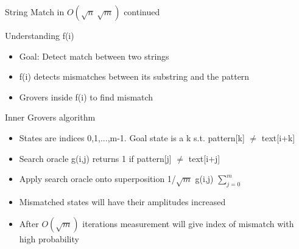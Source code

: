 \documentclass{beamer}
\begin{document}
\begin{frame}{String Match in \(O(\sqrt{n}\ \sqrt{m})\) continued}
  \begin{block}{Understanding f(i)}
    \begin{itemize}
      \item Goal: Detect match between two strings
      \item f(i) detects mismatches between its substring and the pattern
      \item Grovers inside f(i) to find mismatch


    \end{itemize}
  \end{block}
  \begin{block}{Inner Grovers algorithm}
    \begin{itemize}
      \item States are indices 0,1,...,m-1. Goal state is a k s.t. pattern[k] $\neq$ text[i+k]
      \item Search oracle g(i,j) returns 1 if  pattern[j] $\neq$ text[i+j]
      \item Apply search oracle onto superposition 1/$\sqrt{m}$ g(i,j) $\sum_{j=0}^{m} $
      \item Mismatched states will have their amplitudes increased
      \item After \(O(\sqrt{m})\) iterations measurement will give index of mismatch with high probability
    \end{itemize}
  \end{block}
\end{frame}
\end{document}
